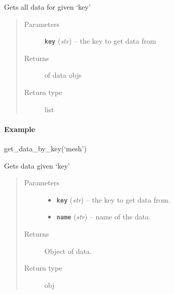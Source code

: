 \documentclass[letterpaper,10pt,english]{sphinxmanual}
\begin{document}
\begin{fulllineitems}
\begin{fulllineitems}
\label{zBuilder:zBuilder.nodeCollection.NodeCollection.get_data_by_key}
Gets all data for given `key'
\begin{quote}\begin{description}
\item[{Parameters}] \leavevmode
\textbf{\texttt{key}} (\emph{str}) -- the key to get data from

\item[{Returns}] \leavevmode
of data objs

\item[{Return type}] \leavevmode
list

\end{description}\end{quote}
\paragraph{Example}

get\_data\_by\_key(`mesh')

\end{fulllineitems}


\begin{fulllineitems}
\label{zBuilder:zBuilder.nodeCollection.NodeCollection.get_data_by_key_name}
Gets data given `key'
\begin{quote}\begin{description}
\item[{Parameters}] \leavevmode\begin{itemize}
\item {} 
\textbf{\texttt{key}} (\emph{str}) -- the key to get data from.

\item {} 
\textbf{\texttt{name}} (\emph{str}) -- name of the data.

\end{itemize}

\item[{Returns}] \leavevmode
Object of data.

\item[{Return type}] \leavevmode
obj

\end{description}\end{quote}

\end{fulllineitems}
\end{fulllineitems}
\end{document}
